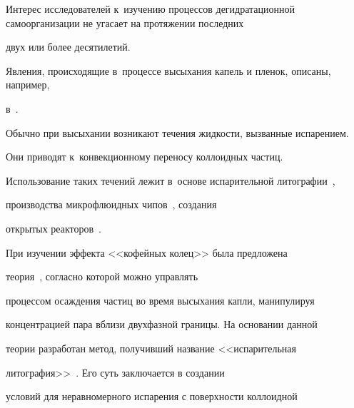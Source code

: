 \date{}








\renewcommand{\JournalDataOnline}{\displaydate{kolegove}}




\makerutitle



\newpage




Интерес исследователей к~изучению процессов дегидратационной самоорганизации не угасает на протяжении последних

двух или более десятилетий. 

Явления, происходящие в~процессе высыхания капель и пленок, описаны, например,

в~\cite{Sefiane2013,Routh2013}. 

Обычно при высыхании возникают течения жидкости, вызванные испарением. 

Они приводят к~конвекционному переносу коллоидных частиц. 

Использование таких течений лежит в~основе испарительной литографии~\cite{Harris2007},

производства микрофлюидных чипов~\cite{Kukhtevich2012}, создания

открытых реакторов~\cite{Rieger}.



При изучении эффекта <<кофейных колец>> была предложена

теория~\cite{Deegan2000}, согласно которой можно управлять

процессом осаждения частиц во время высыхания капли, манипулируя

концентрацией пара вблизи двухфазной границы. На основании данной

теории разработан метод, получивший название <<испарительная

литография>>~\cite{Harris2007}. Его суть заключается в создании

условий для неравномерного испарения с поверхности коллоидной

